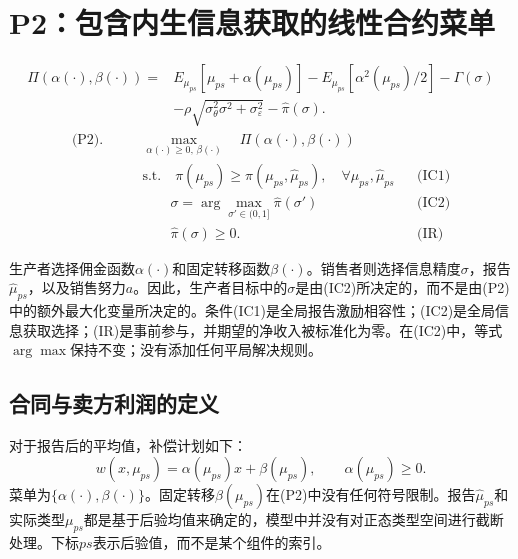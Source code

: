 \documentclass{article}
\begin{document}
\section*{P2：包含内生信息获取的线性合约菜单}

\begin{equation*}
\begin{aligned}
\Pi(\alpha(\cdot),\beta(\cdot))
={}&E_{\mu_{ps}}[\mu_{ps}+\alpha(\mu_{ps})]
-E_{\mu_{ps}}[\alpha^2(\mu_{ps})/2]
-\Gamma(\sigma)\\
&-\rho\sqrt{\sigma_\theta^2\sigma^2+\sigma_\varepsilon^2}
-\widehat{\pi}(\sigma).
\end{aligned}
\end{equation*}
\begin{equation*}
\begin{aligned}
\text{(P2).}\qquad
&\max_{\alpha(\cdot)\geq 0,\,\beta(\cdot)}
\quad \Pi(\alpha(\cdot),\beta(\cdot))\\
&\text{s.t.}\quad
\pi(\mu_{ps})\geq\pi(\mu_{ps},\widehat{\mu}_{ps}),
\quad\forall\mu_{ps},\widehat{\mu}_{ps}
&&\text{(IC1)}\\
&\qquad\sigma=\arg\max_{\sigma'\in(0,1]}\widehat{\pi}(\sigma')
&&\text{(IC2)}\\
&\qquad\widehat{\pi}(\sigma)\geq 0.
&&\text{(IR)}
\end{aligned}
\end{equation*}

生产者选择佣金函数$\alpha(\cdot)$和固定转移函数$\beta(\cdot)$。销售者则选择信息精度$\sigma$，报告$\widehat{\mu}_{ps}$，以及销售努力$a$。因此，生产者目标中的$\sigma$是由(IC2)所决定的，而不是由(P2)中的额外最大化变量所决定的。条件(IC1)是全局报告激励相容性；(IC2)是全局信息获取选择；(IR)是事前参与，并期望的净收入被标准化为零。在(IC2)中，等式$\arg\max$保持不变；没有添加任何平局解决规则。

\subsection*{合同与卖方利润的定义}

对于报告后的平均值，补偿计划如下：
\begin{equation*}
w(x,\mu_{ps})=\alpha(\mu_{ps})x+\beta(\mu_{ps}),
\qquad \alpha(\mu_{ps})\geq 0.
\end{equation*}
菜单为$\{\alpha(\cdot),\beta(\cdot)\}$。固定转移$\beta(\mu_{ps})$在(P2)中没有任何符号限制。报告$\widehat{\mu}_{ps}$和实际类型$\mu_{ps}$都是基于后验均值来确定的，模型中并没有对正态类型空间进行截断处理。下标$ps$表示后验值，而不是某个组件的索引。
\end{document}
